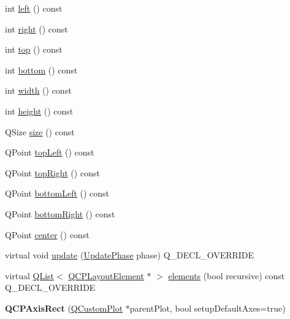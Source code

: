 \begin{DoxyCompactItemize}
\item 
int \hyperlink{class_q_c_p_axis_rect_a55b3ecf72a3a65b053f7651b88db458d}{left} () const 
\item 
int \hyperlink{class_q_c_p_axis_rect_a6d0f989fc552aa2b563cf82f8fc81e61}{right} () const 
\item 
int \hyperlink{class_q_c_p_axis_rect_ac45aef1eb75cea46b241b6303028a607}{top} () const 
\item 
int \hyperlink{class_q_c_p_axis_rect_af2b5982ebe7e6f781b9bf1cc371a60d8}{bottom} () const 
\item 
int \hyperlink{class_q_c_p_axis_rect_a45bf5c17f4ca29131b7eb0db06efc259}{width} () const 
\item 
int \hyperlink{class_q_c_p_axis_rect_a1c55c4f3bef40cf01b21820316c8469e}{height} () const 
\item 
Q\+Size \hyperlink{class_q_c_p_axis_rect_a871b9fe49e92b39a3cbe29a59e458536}{size} () const 
\item 
Q\+Point \hyperlink{class_q_c_p_axis_rect_a88acbe716bcf5072790a6f95637c40d8}{top\+Left} () const 
\item 
Q\+Point \hyperlink{class_q_c_p_axis_rect_a232409546394c23b59407bc62fa460a8}{top\+Right} () const 
\item 
Q\+Point \hyperlink{class_q_c_p_axis_rect_a724b0333971ea6a338f0dbd814dc97ae}{bottom\+Left} () const 
\item 
Q\+Point \hyperlink{class_q_c_p_axis_rect_a49ea3c7dff834b47e266cbf3d79f78b9}{bottom\+Right} () const 
\item 
Q\+Point \hyperlink{class_q_c_p_axis_rect_aea5e6042bca198424fa1bc02fc282e59}{center} () const 
\item 
virtual void \hyperlink{class_q_c_p_axis_rect_add049d464b9ef2ccdc638adc4ccb4aca}{update} (\hyperlink{class_q_c_p_layout_element_a0d83360e05735735aaf6d7983c56374d}{Update\+Phase} phase) Q\+\_\+\+D\+E\+C\+L\+\_\+\+O\+V\+E\+R\+R\+I\+DE
\item 
virtual \hyperlink{class_q_list}{Q\+List}$<$ \hyperlink{class_q_c_p_layout_element}{Q\+C\+P\+Layout\+Element} $\ast$ $>$ \hyperlink{class_q_c_p_axis_rect_a3aee067fd105f2fa8de9eb8024435ac5}{elements} (bool recursive) const Q\+\_\+\+D\+E\+C\+L\+\_\+\+O\+V\+E\+R\+R\+I\+DE
\item 
{\bfseries Q\+C\+P\+Axis\+Rect} (\hyperlink{class_q_custom_plot}{Q\+Custom\+Plot} $\ast$parent\+Plot, bool setup\+Default\+Axes=true)\hypertarget{class_q_c_p_axis_rect_a60b31dece805462c1b82eea2e69ba042}{}\label{class_q_c_p_axis_rect_a60b31dece805462c1b82eea2e69ba042}


\end{DoxyCompactItemize}
